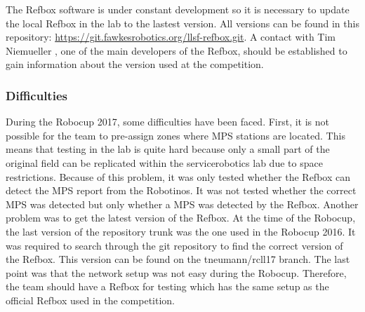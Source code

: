 The Refbox software is under constant development so it is necessary to update the local Refbox in the lab to the lastest version. All versions can be found in this repository: \url{https://git.fawkesrobotics.org/llsf-refbox.git}. A contact with Tim Niemueller \cite{RC2017}, one of the main developers of the Refbox, should be established to gain information about the version used at the competition. \\


\subsubsection{Difficulties}

During the Robocup 2017, some difficulties have been faced. First, it is not possible for the team to pre-assign zones where MPS stations are located. This means that testing in the lab is quite hard because only a small part of the original field can be replicated within the servicerobotics lab due to space restrictions. Because of this problem, it was only tested whether the Refbox can detect the MPS report from the Robotinos. It was not tested whether the correct MPS was detected but only whether a MPS was detected by the Refbox. Another problem was to get the latest version of the Refbox. At the time of the Robocup, the last version of the repository trunk was the one used in the Robocup 2016. It was required to search through the git repository to find the correct version of the Refbox. This version can be found on the tneumann/rcll17 branch. The last point was that the network setup was not easy during the Robocup. Therefore, the team should have a Refbox for testing which has the same setup as the official Refbox used in the competition. \\
